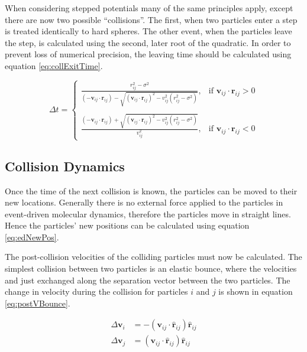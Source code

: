 \documentclass[12pt]{UoAthesis}
\begin{document}
When considering stepped potentials many of the same principles apply,
except there are now two possible ``collisions''. The first, when two
particles enter a step is treated identically to hard spheres. The
other event, when the particles leave the step, is calculated using
the second, later root of the quadratic.  In order to prevent loss of
numerical precision, the leaving time should be calculated using
equation \eqref{eq:collExitTime}.

\begin{equation}
  \label{eq:collExitTime}
\Delta t = 
\begin{cases}
  \frac{r_{ij}^2 - \sigma^2}{(-\mathbf{v}_{ij}\cdot\mathbf{r}_{ij})
    - \sqrt{(\mathbf{v}_{ij}\cdot\mathbf{r}_{ij})^2 
      - v_{ij}^2(r_{ij}^2 - \sigma^2)}}, & \text{if }
  \mathbf{v}_{ij}\cdot\mathbf{r}_{ij} > 0 \\
\\

\frac{(-\mathbf{v}_{ij}\cdot\mathbf{r}_{ij}) +
  \sqrt{(\mathbf{v}_{ij}\cdot\mathbf{r}_{ij})^2 - v_{ij}^2(r_{ij}^2 - \sigma^2)}}
     {v_{ij}^2} , & \text{if }
     \mathbf{v}_{ij}\cdot\mathbf{r}_{ij} < 0 
\end{cases}
\end{equation}

\subsection{Collision Dynamics \label{sec:CollDyn}}
Once the time of the next collision is known, the particles can be moved
to their new locations.  Generally there is no external force applied
to the particles in event-driven molecular dynamics, therefore the
particles move in straight lines.  Hence the particles' new positions
can be calculated using equation \eqref{eq:edNewPos}.



The post-collision velocities of the colliding particles must now be
calculated.  The simplest collision between two particles is an
elastic bounce, where the velocities and just exchanged along the
separation vector between the two particles.  The change in velocity
during the collision for particles $i$ and $j$ is shown in equation
\eqref{eq:postVBounce}.

\begin{subequations}
  \label{eq:postVBounce}
  \begin{align}
    \Delta\mathbf{v}_i &= -(\mathbf{v}_{ij}\cdot\mathbf{\hat{r}}_{ij})\mathbf{\hat{r}}_{ij} \\
    \Delta\mathbf{v}_j &= (\mathbf{v}_{ij}\cdot\mathbf{\hat{r}}_{ij})\mathbf{\hat{r}}_{ij}
  \end{align}
\end{subequations}
\end{document}
